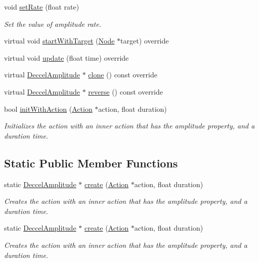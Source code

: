 \begin{DoxyCompactItemize}
void \hyperlink{classDeccelAmplitude_ad73ca698974b6643c865c6debaa0e6da}{set\+Rate} (float rate)
\begin{DoxyCompactList}\small\item\em Set the value of amplitude rate. \end{DoxyCompactList}\item 
virtual void \hyperlink{classDeccelAmplitude_a6926155c154880f8a1f6c4ad6336c446}{start\+With\+Target} (\hyperlink{classNode}{Node} $\ast$target) override
\item 
virtual void \hyperlink{classDeccelAmplitude_aaba8cfb70eadc2c0c4d732dbc8280731}{update} (float time) override
\item 
virtual \hyperlink{classDeccelAmplitude}{Deccel\+Amplitude} $\ast$ \hyperlink{classDeccelAmplitude_a769fbde5c93a7b4a660cbeca9332dce9}{clone} () const override
\item 
virtual \hyperlink{classDeccelAmplitude}{Deccel\+Amplitude} $\ast$ \hyperlink{classDeccelAmplitude_a4720cda1d91ad11b91674a821eff6dce}{reverse} () const override
\item 
bool \hyperlink{classDeccelAmplitude_ac0f006d31810192002d96826dc88a85b}{init\+With\+Action} (\hyperlink{classAction}{Action} $\ast$action, float duration)
\begin{DoxyCompactList}\small\item\em Initializes the action with an inner action that has the amplitude property, and a duration time. \end{DoxyCompactList}\end{DoxyCompactItemize}
\subsection*{Static Public Member Functions}
\begin{DoxyCompactItemize}
\item 
static \hyperlink{classDeccelAmplitude}{Deccel\+Amplitude} $\ast$ \hyperlink{classDeccelAmplitude_a9316a87a85acf7b557ca1a2866f3710a}{create} (\hyperlink{classAction}{Action} $\ast$action, float duration)
\begin{DoxyCompactList}\small\item\em Creates the action with an inner action that has the amplitude property, and a duration time. \end{DoxyCompactList}\item 
static \hyperlink{classDeccelAmplitude}{Deccel\+Amplitude} $\ast$ \hyperlink{classDeccelAmplitude_adeb695c02981198a7dd6dddda6a2f3d1}{create} (\hyperlink{classAction}{Action} $\ast$action, float duration)
\begin{DoxyCompactList}\small\item\em Creates the action with an inner action that has the amplitude property, and a duration time. \end{DoxyCompactList}\end{DoxyCompactItemize}
